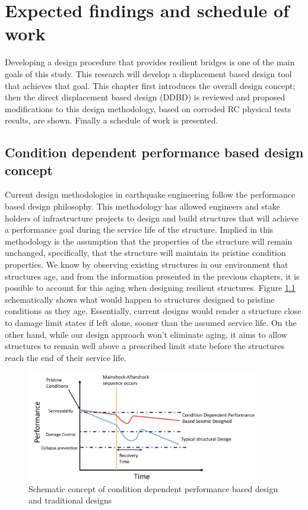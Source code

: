 \chapter{Expected findings and schedule of work}
Developing a design procedure that provides resilient bridges is one of the main goals of this study. This research will develop a displacement based design tool that achieves that goal. This chapter first introduces the overall design concept; then the direct displacement based design (DDBD) is reviewed and proposed modifications to this design methodology, based on corroded RC physical tests results, are shown. Finally a schedule of work is presented.

\section{Condition dependent performance based design concept}

Current design methodologies in earthquake engineering follow the performance based design philosophy. This methodology has allowed engineers and stake holders of infrastructure projects to design and build structures that will achieve a performance goal during the service life of the structure. Implied in this methodology is the assumption that the properties of the structure will remain unchanged, specifically, that the structure will maintain its pristine condition properties. We know by observing existing structures in our environment that structures age, and from the information presented in the previous chapters, it is possible to account for this aging when designing resilient structures. Figure \ref{fig:Concept_CD-DDBD} schematically shows what would happen to structures designed to pristine conditions as they age. Essentially, current designs would render a structure close to damage limit states if left alone, sooner than the assumed service life. On the other hand, while our design approach won’t eliminate aging, it aims to allow structures to remain well above a prescribed limit state before the structures reach the end of their service life. 

\begin{figure}[htbp]
	\centering
	\includegraphics[width=0.90\textwidth]{VAC Prelim 2.0/Chapter-5/figs/CD_DDBD_Concept.png}
	\caption{Schematic concept of condition dependent performance based design and traditional designs}
	\label{fig:Concept_CD-DDBD}
\end{figure}

